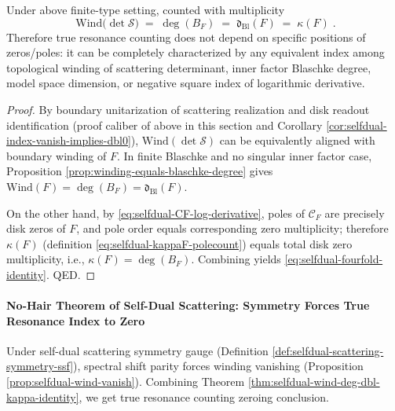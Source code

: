 \begin{theorem}\label{thm:selfdual-wind-deg-dbl-kappa-identity}
Under above finite-type setting, counted with multiplicity
\begin{equation}\label{eq:selfdual-fourfold-identity}
\boxed{\;
\mathrm{Wind}\bigl(\det\mathcal S\bigr)
\;=\;
\deg(B_F)
\;=\;
\mathfrak d_{\mathrm{Bl}}(F)
\;=\;
\kappa(F)\; }.
\end{equation}
Therefore true resonance counting does not depend on specific positions of zeros/poles: it can be completely characterized by any equivalent index among topological winding of scattering determinant, inner factor Blaschke degree, model space dimension, or negative square index of logarithmic derivative.
\end{theorem}

\begin{proof}
By boundary unitarization of scattering realization and disk readout identification (proof caliber of above in this section and Corollary \ref{cor:selfdual-index-vanish-implies-dbl0}), \(\mathrm{Wind}(\det\mathcal S)\) can be equivalently aligned with boundary winding of \(F\).
In finite Blaschke and no singular inner factor case, Proposition \ref{prop:winding-equals-blaschke-degree} gives
\(\mathrm{Wind}(F)=\deg(B_F)=\mathfrak d_{\mathrm{Bl}}(F)\).
\par
On the other hand, by \eqref{eq:selfdual-CF-log-derivative},
poles of \(\mathscr{C}_F\) are precisely disk zeros of \(F\), and pole order equals corresponding zero multiplicity; therefore \(\kappa(F)\) (definition \eqref{eq:selfdual-kappaF-polecount}) equals total disk zero multiplicity, i.e., \(\kappa(F)=\deg(B_F)\).
Combining yields \eqref{eq:selfdual-fourfold-identity}. QED.
\end{proof}

\paragraph{No-Hair Theorem of Self-Dual Scattering: Symmetry Forces True Resonance Index to Zero}
Under self-dual scattering symmetry gauge (Definition \ref{def:selfdual-scattering-symmetry-ssf}), spectral shift parity forces winding vanishing (Proposition \ref{prop:selfdual-wind-vanish}).
Combining Theorem \ref{thm:selfdual-wind-deg-dbl-kappa-identity}, we get true resonance counting zeroing conclusion.

